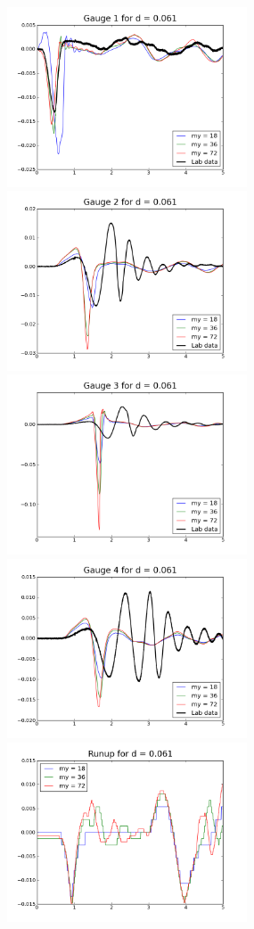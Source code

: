 \begin{figure}[ht]

\hfil\includegraphics[width=2.8in]{bp3/gauge1-d0-061.png}\hfil
\hfil\includegraphics[width=2.8in]{bp3/gauge2-d0-061.png}\hfil
\vskip 10pt
\hfil\includegraphics[width=2.8in]{bp3/gauge3-d0-061.png}\hfil
\hfil\includegraphics[width=2.8in]{bp3/gauge4-d0-061.png}\hfil
\vskip 10pt
\hfil\includegraphics[width=2.8in]{bp3/runup-d0-061.png}\hfil


\end{figure}

